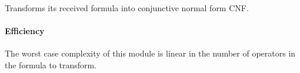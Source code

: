 Transforms its received formula into conjunctive normal form CNF.

\paragraph{Efficiency} The worst case complexity of this module is linear in the number of operators in the formula to transform.